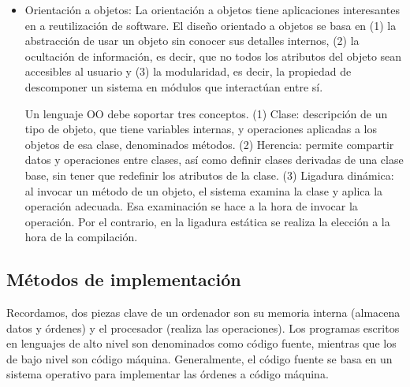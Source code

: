 \documentclass[a4paper]{article}
\begin{document}
\begin{itemize}
	 	\item Orientación a objetos: La orientación a objetos tiene aplicaciones interesantes en a reutilización de software. El diseño orientado a objetos se basa en (1) la abstracción de usar un objeto sin conocer sus detalles internos, (2) la ocultación de información, es decir, que no todos los atributos del objeto sean accesibles al usuario y (3) la modularidad, es decir, la propiedad de descomponer un sistema en módulos que interactúan entre sí.
	 	
	 	Un lenguaje OO debe soportar tres conceptos. (1) Clase: descripción de un tipo de objeto, que tiene variables internas, y operaciones aplicadas a los objetos de esa clase, denominados métodos. (2) Herencia: permite compartir datos y operaciones entre clases, así como definir clases derivadas de una clase base, sin tener que redefinir los atributos de la clase. (3) Ligadura dinámica: al invocar un método de un objeto, el sistema examina la clase y aplica la operación adecuada. Esa examinación se hace a la hora de invocar la operación. Por el contrario, en la ligadura estática se realiza la elección a la hora de la compilación.
	 \end{itemize}
	 
	 \subsection{Métodos de implementación}
	 
	 Recordamos, dos piezas clave de un ordenador son su memoria interna (almacena datos y órdenes) y el procesador (realiza las operaciones). Los programas escritos en lenguajes de alto nivel son denominados como código fuente, mientras que los de bajo nivel son código máquina. Generalmente, el código fuente se basa en un sistema operativo para implementar las órdenes a código máquina.
	 
\end{document}
